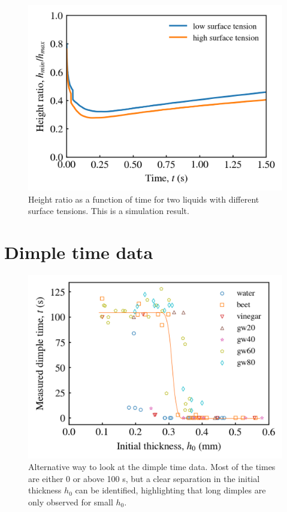 \documentclass[aps,preprint]{revtex4-2}
\begin{document}
\begin{figure}[ht]
    \centering
    \includegraphics[width=\linewidth]{Figures/surface_tension_effect.png}
    \caption{
    Height ratio as a function of time for two liquids with different surface tensions. This is a simulation result.
    }
    \label{fig:surface-tension-effect}
\end{figure}

\newpage

\section{Dimple time data}

\begin{figure}[ht]
    \centering
    \includegraphics[width=\linewidth]{Figures/all_dimple_time_data}
    \caption{
    Alternative way to look at the dimple time data. Most of the times are either 0 or above 100 s, but a clear separation in the initial thickness $h_0$ can be identified, highlighting that long dimples are only observed for small $h_0$.
    }
    \label{fig:all-dimple-time-data}
\end{figure}
\end{document}
